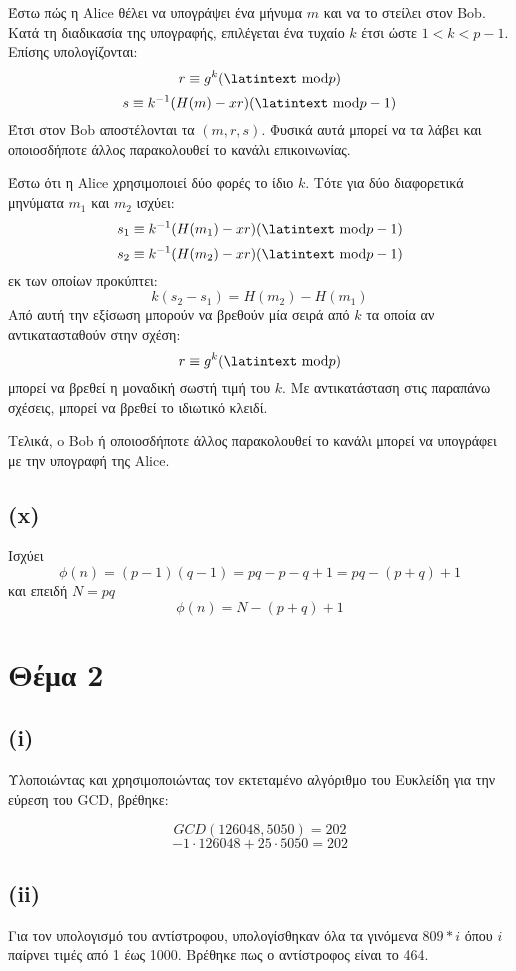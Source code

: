\documentclass[a4paper, 11pt]{article}
\newcommand{\lt}{\latintext}
\begin{document}
Έστω πώς η {\lt Alice} θέλει να υπογράψει ένα μήνυμα $m$ και να το στείλει στον {\lt Bob}. Κατά τη διαδικασία της υπογραφής, επιλέγεται ένα τυχαίο $k$ έτσι ώστε $ 1 < k < p-1 $. Επίσης υπολογίζονται:
\[ r \equiv g^k (\textrm{\lt mod} p) \]
\[ s \equiv k^{-1}(H(m)-xr) (\textrm{\lt mod} p-1)\]
Έτσι στον {\lt Bob} αποστέλονται τα $(m,r,s)$. Φυσικά αυτά μπορεί να τα λάβει και οποιοσδήποτε άλλος παρακολουθεί το κανάλι επικοινωνίας.

Έστω ότι η {\lt Alice} χρησιμοποιεί δύο φορές το ίδιο $k$. Τότε για δύο διαφορετικά μηνύματα $m_1$ και $m_2$ ισχύει:
\[ s_1 \equiv k^{-1}(H(m_1)-xr) (\textrm{\lt mod} p-1)\]
\[ s_2 \equiv k^{-1}(H(m_2)-xr) (\textrm{\lt mod} p-1)\]
εκ των οποίων προκύπτει:
\[k(s_2 - s_1) = H(m_2) - H(m_1)\]
Από αυτή την εξίσωση μπορούν να βρεθούν μία σειρά από $k$ τα οποία αν αντικατασταθούν στην σχέση:
\[ r \equiv g^k (\textrm{\lt mod} p) \]
μπορεί να βρεθεί η μοναδική σωστή τιμή του $k$. Με αντικατάσταση στις παραπάνω σχέσεις, μπορεί να βρεθεί το ιδιωτικό κλειδί.

Τελικά, o {\lt Bob} ή οποιοσδήποτε άλλος παρακολουθεί το κανάλι μπορεί να υπογράφει με την υπογραφή της {\lt Alice}.

\subsection*{({\lt x})}
Ισχύει
\[\phi(n) = (p-1)(q-1) = pq - p - q + 1 = pq - (p+q) + 1\]
και επειδή $N = pq$
\[\phi(n) = N - (p+q) + 1\]
\newpage


\section*{Θέμα 2}
\subsection*{({\lt i})}
Υλοποιώντας και χρησιμοποιώντας τον εκτεταμένο αλγόριθμο του Ευκλείδη για την εύρεση του {\lt GCD}, βρέθηκε:

\[GCD(126048, 5050) = 202\]
\[-1 \cdot 126048 + 25 \cdot 5050 = 202\]

\subsection*{({\lt ii})}
Για τον υπολογισμό του αντίστροφου, υπολογίσθηκαν όλα τα γινόμενα $ 809 * i $ όπου $i$ παίρνει τιμές από 1 έως 1000. Βρέθηκε πως ο αντίστροφος είναι το 464.
\end{document}
